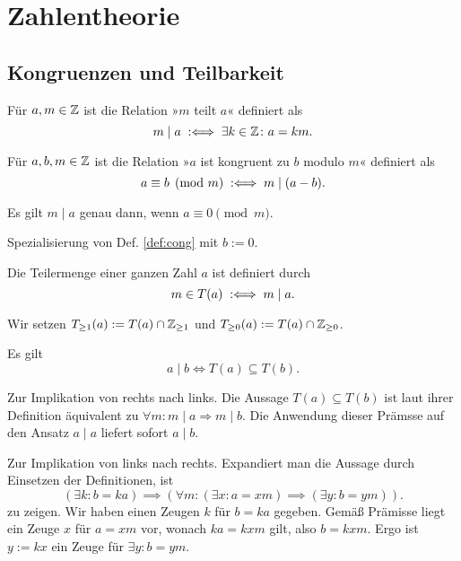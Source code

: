 
\chapter{Zahlentheorie}
\section{Kongruenzen und Teilbarkeit}

\begin{Definition}[Teiler]
Für $a,m\in\mathbb Z$ ist die Relation »$m$ teilt
$a$« definiert als
\[m\mid a\;:\Longleftrightarrow\; \exists k\in\mathbb Z\colon a = km.\]
\end{Definition}

\begin{Definition}[Kongruenz]\label{def:cong}
Für $a,b,m\in\mathbb Z$ ist die Relation »$a$ ist kongruent zu $b$ modulo
$m$« definiert als
\[a\equiv b \pmod m \;:\Longleftrightarrow\; m\mid (a-b).\]
\end{Definition}

\begin{Satz}
Es gilt $m\mid a$ genau dann, wenn $a\equiv 0\pmod m$.
\end{Satz}
\begin{Beweis}
Spezialisierung von Def. \ref{def:cong} mit $b:=0$.\,\qedsymbol
\end{Beweis}

\begin{Definition}[Teilermenge]
Die Teilermenge einer ganzen Zahl $a$ ist definiert durch
\[m\in T(a)\;:\Longleftrightarrow\; m\mid a.\]
\end{Definition}
 Wir setzen $T_{\ge 1}(a):=T(a)\cap\mathbb Z_{\ge 1}$ und
$T_{\ge 0}(a):=T(a)\cap\mathbb Z_{\ge 0}$.

\begin{Satz}\label{divisor-divisor-subset} Es gilt
\[a\mid b \iff T(a)\subseteq T(b).\]
\end{Satz}
\begin{Beweis}
Zur Implikation von rechts nach links.
Die Aussage $T(a)\subseteq T(b)$ ist laut ihrer Definition
äquivalent zu $\forall m\colon m\mid a\Rightarrow m\mid b$.
Die Anwendung dieser Prämsse auf den Ansatz $a\mid a$
liefert sofort $a\mid b$.

Zur Implikation von links nach rechts. Expandiert man die Aussage
durch Einsetzen der Definitionen, ist
\[(\exists k\colon b=ka)\implies
(\forall m\colon (\exists x\colon a=xm)\implies (\exists y\colon b=ym)).\]
zu zeigen. Wir haben einen Zeugen $k$ für $b=ka$ gegeben. 
Gemäß Prämisse liegt ein Zeuge $x$ für $a=xm$ vor, wonach $ka=kxm$
gilt, also $b=kxm$. Ergo ist $y:=kx$ ein Zeuge für
$\exists y\colon b=ym$.\,\qedsymbol
\end{Beweis}

